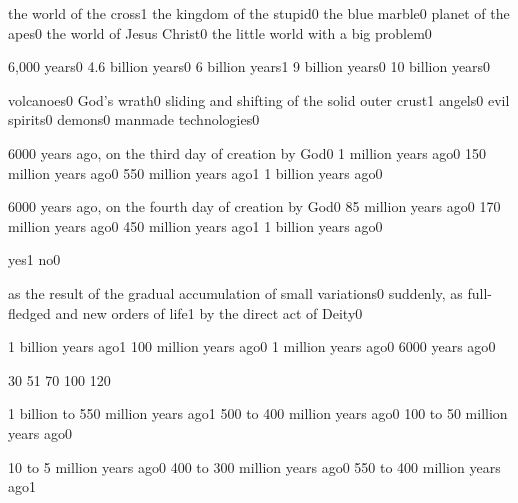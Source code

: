 
{the world of the cross}{1}
{the kingdom of the stupid}{0}
{the blue marble}{0}
{planet of the apes}{0}
{the world of Jesus Christ}{0}
{the little world with a big problem}{0}
\qstop

{6,000 years}{0}
{4.6 billion years}{0}
{6 billion years}{1}
{9 billion years}{0}
{10 billion years}{0}
\qstop


{volcanoes}{0}
{God's wrath}{0}
{sliding and shifting of the solid outer crust}{1}
{angels}{0}
{evil spirits}{0}
{demons}{0}
{manmade technologies}{0}
\qstop

{6000 years ago, on the third day of creation by God}{0}
{1 million years ago}{0}
{150 million years ago}{0}
{550 million years ago}{1}
{1 billion years ago}{0}
\qstop

{6000 years ago, on the fourth day of creation by God}{0}
{85 million years ago}{0}
{170 million years ago}{0}
{450 million years ago}{1}
{1 billion years ago}{0}
\qstop

{yes}{1}
{no}{0}
\qstop

{as the result of the gradual accumulation of small variations}{0}
{suddenly, as full\hyp{}fledged and new orders of life}{1}
{by the direct act of Deity}{0}
\qstop


{1 billion years ago}{1}
{100 million years ago}{0}
{1 million years ago}{0}
{6000 years ago}{0}
\qstop

{3}{0}
{5}{1}
{7}{0}
{10}{0}
{12}{0}
\qstop

{1 billion to 550 million years ago}{1}
{500 to 400 million years ago}{0}
{100 to 50 million years ago}{0}
\qstop

{10 to 5 million years ago}{0}
{400 to 300 million years ago}{0}
{550 to 400 million years ago}{1}
\qstop

